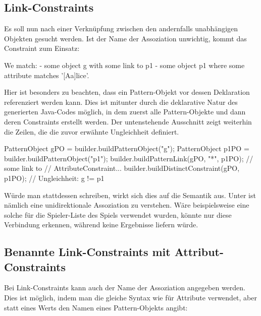 \subsection{Link-Constraints}

Es soll nun nach einer Verknüpfung zwischen den andernfalls unabhängigen Objekten gesucht werden.
Ist der Name der Assoziation unwichtig, kommt das Constraint  zum Einsatz:

\begin{mdcodeblock}
    We match:
    - some object g with some link to p1
    - some object p1 where some attribute matches '[Aa]lice'.
\end{mdcodeblock}

Hier ist besonders zu beachten, dass ein Pattern-Objekt vor dessen Deklaration referenziert werden kann.
Dies ist mitunter durch die deklarative Natur des generierten Java-Codes möglich,
in dem zuerst alle Pattern-Objekte und dann deren Constraints erstellt werden.
Der untenstehende Ausschnitt zeigt weiterhin die Zeilen, die die zuvor erwähnte Ungleichheit definiert.

\begin{jcodeblock}
    PatternObject gPO = builder.buildPatternObject("g");
    PatternObject p1PO = builder.buildPatternObject("p1");
    builder.buildPatternLink(gPO, "*", p1PO); // some link to
    // AttributeConstraint...
    builder.buildDistinctConstraint(gPO, p1PO); // Ungleichheit: g != p1
\end{jcodeblock}

Würde man stattdessen  schreiben,
wirkt sich dies auf die Semantik aus.
Unter  ist nämlich eine unidirektionale Assoziation zu verstehen.
Wäre beispielsweise eine solche für die Spieler-Liste des Spiels verwendet wurden,
könnte nur  diese Verbindung erkennen,
während  keine Ergebnisse liefern würde.

\subsection{Benannte Link-Constraints mit Attribut-Constraints}

Bei Link-Constraints kann auch der Name der Assoziation angegeben werden.
Dies ist möglich, indem man die gleiche Syntax wie für Attribute verwendet,
aber statt eines Werts den Namen eines Pattern-Objekts angibt:

